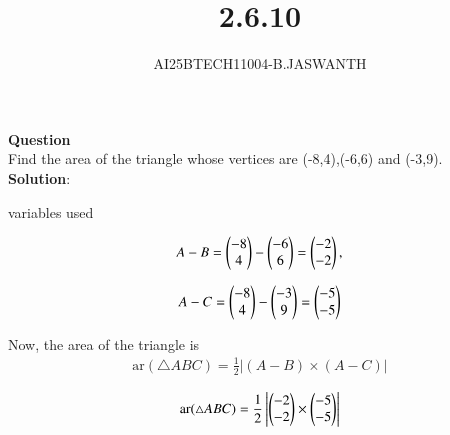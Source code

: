 \documentclass[journal]{IEEEtran}
\begin{document}

\vspace{3cm}


\renewcommand{\thetable}{\theenumi}




\vspace{3cm}


\title{2.6.10}
\author{AI25BTECH11004-B.JASWANTH}
{\let\newpage\relax\maketitle}


\renewcommand{\thefigure}{\theenumi}
\renewcommand{\thetable}{\theenumi}
\setlength{\intextsep}{10pt} %

\textbf{Question}\\
Find the area of the triangle whose vertices are (-8,4),(-6,6) and (-3,9).\\
\textbf{Solution}:\\ 


\begin{table}[h!]
	\centering
	
	\caption{variables used}
	\label{}
\end{table}
\begin{align}
A-B = \begin{pmatrix}-8 \\ 4\end{pmatrix} - \begin{pmatrix}-6 \\ 6\end{pmatrix} 
= \begin{pmatrix}-2 \\ -2\end{pmatrix},
\end{align}

\begin{align}
A-C = \begin{pmatrix}-8 \\ 4\end{pmatrix} - \begin{pmatrix}-3 \\ 9\end{pmatrix}
	= \begin{pmatrix}-5 \\ -5\end{pmatrix}
 \end{align}




Now, the area of the triangle is
\begin{align}
 \text{ar}(\triangle ABC) 
= \frac{1}{2} \left| (A-B) \times (A-C) \right|   
\end{align}

\begin{align}
 \text{ar}(\triangle ABC)=  \frac{1}{2} \left| \begin{pmatrix}-2 \\ -2\end{pmatrix} \times  \begin{pmatrix}-5 \\ -5\end{pmatrix} \right |
\end{align}
\end{document}
